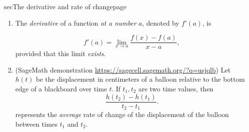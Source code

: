 \documentclass[../main]{subfiles}
\begin{document}
\begin{outline}{sec}{The derivative and rate of change}{page} \label{act:derivative}
  \begin{enumerate}
    \item {The \emph{derivative} of a function \emph{at a number} \(a\), denoted by \(f'(a)\), is}
      \begin{mdframed}[style=simple]
        \begin{equation} \label{eq:derivative} 
          f'(a) = \lim_{x \to a} \frac{f(x) - f(a)}{x - a},
        \end{equation}
        provided that this limit \emph{exists}.
      \end{mdframed}
        
    \item \label{part:balloon} (SageMath demonstration \url{https://sagecell.sagemath.org/?q=usjqlb}) Let \(h(t)\) be the displacement in centimeters of a balloon relative to the bottom edge of a blackboard over time \(t\).  If \(t_{1}, t_{2}\) are two time values, then
      \[
        \frac{h(t_{2}) - h(t_{1})}{t_{2} - t_{1}}.
      \]
      represents the \emph{average} rate of change of the displacement of the balloon between times \(t_{1}\) and \(t_{2}\).


\end{enumerate}
\end{outline}
\end{document}
